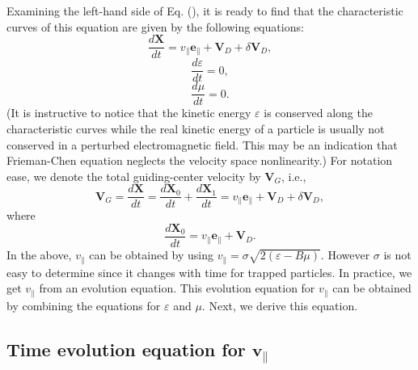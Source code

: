 \documentclass{article}
\begin{document}
Examining the left-hand side of Eq. (), it is ready to find that the
characteristic curves of this equation are given by the following equations:
\begin{equation}
  \label{16-10-11-3} \frac{d\mathbf{X}}{d t} = v_{\parallel}
  \mathbf{e}_{\parallel} +\mathbf{V}_D + \delta \mathbf{V}_D,
\end{equation}
\begin{equation}
  \label{16-10-12-1} \frac{d \varepsilon}{d t} = 0,
\end{equation}
\begin{equation}
  \label{16-10-12-2} \frac{d \mu}{d t} = 0.
\end{equation}
(It is instructive to notice that the kinetic energy $\varepsilon$ is
conserved along the characteristic curves while the real kinetic energy of a
particle is usually not conserved in a perturbed electromagnetic field. This
may be an indication that Frieman-Chen equation neglects the velocity space
nonlinearity.) For notation ease, we denote the total guiding-center velocity
by $\mathbf{V}_G$, i.e.,
\begin{equation}
  \mathbf{V}_G = \frac{d\mathbf{X}}{d t} = \frac{d\mathbf{X}_0}{d t} +
  \frac{d\mathbf{X}_1}{d t} = v_{\parallel} \mathbf{e}_{\parallel}
  +\mathbf{V}_D + \delta \mathbf{V}_D,
\end{equation}
where
\begin{equation}
  \frac{d\mathbf{X}_0}{d t} = v_{\parallel} \mathbf{e}_{\parallel}
  +\mathbf{V}_D .
\end{equation}
In the above, $v_{\parallel}$ can be obtained by using $v_{\parallel} = \sigma
\sqrt{2 (\varepsilon - B \mu)}$. However $\sigma$ is not easy to determine
since it changes with time for trapped particles. In practice, we get
$v_{\parallel}$ from an evolution equation. This evolution equation for
$v_{\parallel}$ can be obtained by combining the equations for $\varepsilon$
and $\mu$. Next, we derive this equation.

\subsection{Time evolution equation for $\mathbf{v}_{\parallel}$}
\end{document}
